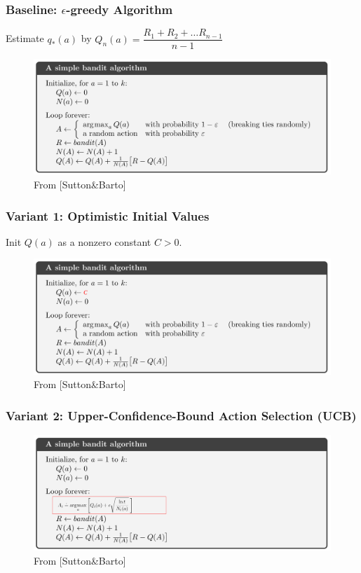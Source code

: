 \documentclass[10pt]{beamer}
\theoremstyle{remark}
\begin{document}
\begin{frame}
    \frametitle{Baseline: $\epsilon$-greedy Algorithm}
    Estimate $q_{\ast}(a)$ by $Q_n(a) = \dfrac{R_1 + R_2 + \ldots  R_{n-1}}{n-1}$
    \begin{figure}
        \includegraphics[width=\textwidth]{figures/simple_alg.png}
        \caption{From [Sutton\&Barto]}
    \end{figure}
\end{frame}

\begin{frame}
    \frametitle{Variant 1: Optimistic Initial Values}
    Init $Q(a)$ as a nonzero constant $C > 0$.
    \begin{figure}
        \includegraphics[width=\textwidth]{figures/simple_alg1.png}
        \caption{From [Sutton\&Barto]}
    \end{figure}
\end{frame}

\begin{frame}
    \frametitle{Variant 2: Upper-Confidence-Bound Action Selection (UCB)}
    \begin{figure}
        \includegraphics[width=\textwidth]{figures/simple_alg2.png}
        \caption{From [Sutton\&Barto]}
    \end{figure}
\end{frame}
\end{document}
